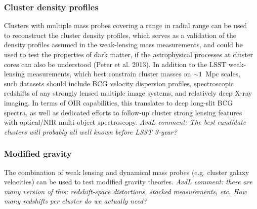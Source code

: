 \subsubsection{Cluster density profiles}

Clusters with multiple mass probes covering a range in radial range can be used to reconstruct the cluster density profiles, which serves as a validation of the density profiles assumed in the weak-lensing mass measurements, and could be used to test the properties of dark matter, if the astrophysical processes at cluster cores can also be understood (Peter et al. 2013).  In addition to the LSST weak-lensing measurements, which best constrain cluster masses on $\sim1$~Mpc scales, such datasets should include BCG velocity dispersion profiles, spectroscopic redshifts of any strongly lensed multiple image systems, and relatively deep X-ray imaging. In terms of OIR capabilities, this translates to deep long-slit BCG spectra, as well as dedicated efforts to follow-up cluster strong lensing features with optical/NIR multi-object spectroscopy.  {\it AvdL comment: The best candidate clusters will probably all well known before LSST 3-year?}

\subsubsection{Modified gravity}

The combination of weak lensing and dynamical mass probes (e.g. cluster galaxy velocities) can be used to test modified gravity theories.  {\it AvdL comment: there are many version of this: redshift-space distortions, stacked measurements, etc.  How many redshifts per cluster do we actually need?}

